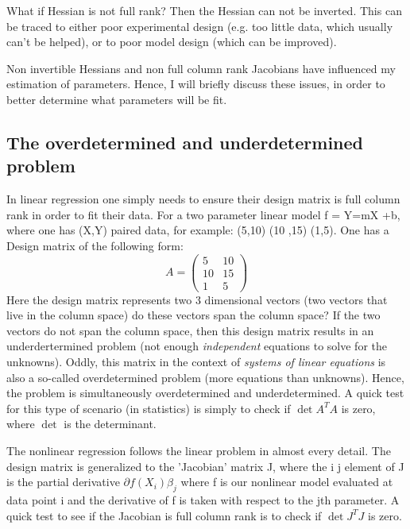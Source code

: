  What if Hessian is not full rank?  Then the Hessian can not be inverted.  This can be traced to either poor experimental design (e.g. too little data, which usually can't be helped), or to poor model design (which can be improved).  
 
 Non invertible Hessians and non full column rank Jacobians have influenced my estimation of parameters.  Hence, I will briefly discuss these issues, in order to better determine what parameters will be fit.
 
 \subsection{The overdetermined and underdetermined problem}\label{overdeter}
In linear regression one simply needs to ensure their design matrix is full column rank in order to fit their data.  For a two parameter linear model f = Y=mX +b, where one has (X,Y) paired data, for example: (5,10) (10 ,15) (1,5).  One has a Design matrix of the following form:
\[ A =
\begin{pmatrix}
5 & 10 \\
10&15\\
1&5
\end{pmatrix}
\]
Here the design matrix represents two 3 dimensional vectors (two vectors that live in the column space) do these vectors span the column space?  If the two vectors do not span the column space, then this design matrix results in an underdertermined problem (not enough \emph{independent} equations to solve for the unknowns).  Oddly, this matrix in the context of \emph{systems of linear equations} is also a so-called overdetermined problem (more equations than unknowns).  Hence, the problem is simultaneously overdetermined and underdetermined.  A quick test for this type of scenario (in statistics) is simply to check if $\det{A^TA}$ is zero, where $\det$ is  the determinant.

The nonlinear regression follows the linear problem in almost every detail.  The design matrix is generalized to the 'Jacobian' matrix J, where the i j element of J is the partial derivative $\partial{f(X_i)}{\beta_j}$ where f is our nonlinear model evaluated at data point i and the derivative of f is taken with respect to the jth parameter.  A quick test to see if the Jacobian is full column rank is to check if $\det{J^TJ}$ is zero.

